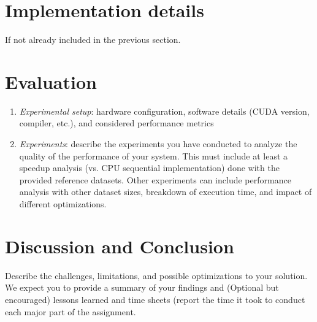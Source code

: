 \documentclass[sigconf, nonacm, review]{acmart}
\begin{document}
\section{Implementation details}
If not already included in the previous section.

\section{Evaluation}

\begin{enumerate}
\item \textit{Experimental setup}: hardware configuration, software details (CUDA version, compiler, etc.), and considered performance metrics
\item \textit{Experiments}: 
\label{experiments} describe the experiments you have conducted to analyze the quality of the performance of your system. This must include at least a speedup analysis (vs. CPU sequential implementation) done with the provided reference datasets. Other experiments can include performance analysis with other dataset sizes, breakdown of execution time, and impact of different optimizations.
\end{enumerate}

\section{Discussion and Conclusion}

Describe the challenges, limitations, and possible optimizations to your solution. We expect you to provide a summary of your findings and (Optional but encouraged) lessons learned and time sheets (report the time it took to conduct each major part of the assignment.




\end{document}
